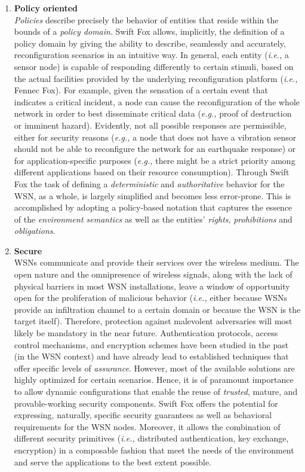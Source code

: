 \documentclass[11pt]{article}
\begin{document}
\begin{enumerate}
	\item \textbf{Policy oriented}		\\
	\textit{Policies} describe precisely the behavior of entities
	that reside within the bounds of a \textit{policy domain}. Swift
	Fox allows, implicitly, the definition of a policy domain by
	giving the ability to describe, seamlessly and accurately,
	reconfiguration scenarios in an intuitive way. In general, each
	entity (\textit{i.e.,} a sensor node) is capable of responding
	differently to certain stimuli, based on the actual facilities
	provided by the underlying reconfiguration platform
	(\textit{i.e.,} Fennec Fox). For example, given the sensation of a
	certain event that indicates a critical incident, a node can cause
	the reconfiguration of the whole network in order to best
	disseminate critical data (\textit{e.g.,} proof of destruction
	or imminent hazard). Evidently, not all possible responses are
	permissible, either for security reasons (\textit{e.g.,} a node
	that does not have a vibration sensor should not be able to
	reconfigure the network for an earthquake response) or for
	application-specific purposes (\textit{e.g.,} there might be a
	strict priority among different applications based on their
	resource consumption). Through Swift Fox the task of defining a
	\textit{deterministic} and \textit{authoritative} behavior for the 
	WSN, as a whole, is largely simplified and becomes less
	error-prone. This is accomplished by adopting a policy-based
	notation that captures the essence of the \textit{environment
	semantics} as well as the entities' \textit{rights},
	\textit{prohibitions} and \textit{obligations}. 
	
	\item \textbf{Secure}			\\
	WSNs communicate and provide their services over the wireless
	medium. The open nature and the omnipresence of wireless signals,
	along with the lack of physical barriers in most WSN
	installations, leave a window of opportunity open for the
	proliferation of malicious behavior (\textit{i.e.,} either because
	WSNs provide an infiltration channel to a certain domain or
	because the WSN is the target itself). Therefore, protection
	against malevolent adversaries will most likely be mandatory in
	the near future. Authentication protocols, access control
	mechanisms, and encryption schemes have been studied in the past
	(in the WSN context) and have already lead to established
	techniques that offer specific levels of \textit{assurance}.
	However, most of the available solutions are highly optimized for 
	certain scenarios. Hence, it is of paramount importance to allow 
	dynamic configurations that enable the reuse of \textit{trusted}, 
	mature, and provable-working security components. Swift Fox offers
	the potential for expressing, naturally, specific security
	guarantees as well as behavioral requirements for the WSN nodes.
	Moreover, it allows the combination of different security
	primitives (\textit{i.e.,} distributed authentication, key
	exchange, encryption) in a composable fashion that meet the needs 
	of the environment and serve the applications to the best extent
	possible.


\end{enumerate}
\end{document}
